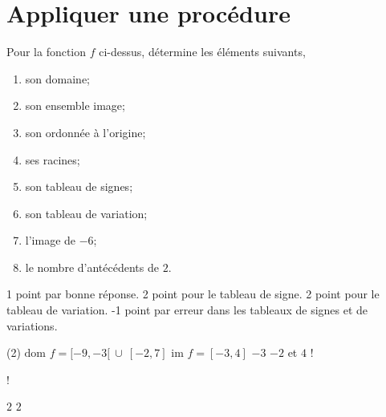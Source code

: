 \documentclass[a4paper, 12pt, parskip=half-]{scrartcl}
\begin{document}
\section*{ Appliquer une procédure}
\begin{exercise}[points=10]
    \begin{center}
        
    \end{center}
    Pour la fonction $f$ ci-dessus, détermine les éléments suivants,
    \begin{enumerate}[cols=2]
        \item son domaine;
        \item son ensemble image;
        \item son ordonnée à l'origine;
        \item ses racines;
        \item son tableau de signes;
        \item son tableau de variation;
        \item l'image de $-6$;
        \item le nombre d'antécédents de $2$.
    \end{enumerate}
\end{exercise}
\begin{solution}
    1 point par bonne réponse.
    2 point pour le tableau de signe.
    2 point pour le tableau de variation.
    -1 point par erreur dans les tableaux de signes et de variations.
    \begin{tasks}(2)
        \task $\textrm{dom }f=[-9,-3[~\cup~[-2,7]$
        \task $\textrm{im }f=[-3,4]$
        \task $-3$
        \task $-2$ et $4$
        \task!
        \task!
        \task $2$
        \task $2$
    \end{tasks}
\end{solution}
\end{document}
